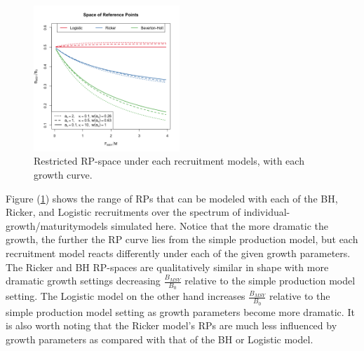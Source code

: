 %
\begin{figure}
\vspace{-1.5cm}
\includegraphics[width=0.49\textwidth]{../ddBias/rpTriptic.png}
\vspace{-0.75cm}
\caption{Restricted RP-space under each recruitment models, 
with each growth curve.}\label{rpTriptic}
\end{figure}
%
Figure (\ref{rpTriptic}) shows the range of RPs that can be modeled with each 
of the BH, Ricker, and Logistic recruitments over the spectrum of 
individual-growth/maturitymodels simulated here. Notice that the more dramatic 
the growth, the further the RP curve lies from the simple production model, 
but each recruitment model reacts differently under each of the given growth 
parameters. The Ricker and BH RP-spaces are qualitatively similar in shape 
with more dramatic growth settings decreasing $\frac{B_{MSY}}{B_0}$ relative to the 
simple production model setting. The Logistic model on the other hand increases 
$\frac{B_{MSY}}{B_0}$ relative to the simple production model setting as growth 
parameters become more dramatic. It is also worth noting that the Ricker model's 
RPs are much less influenced by growth parameters as compared with that of the 
BH or Logistic model. 




